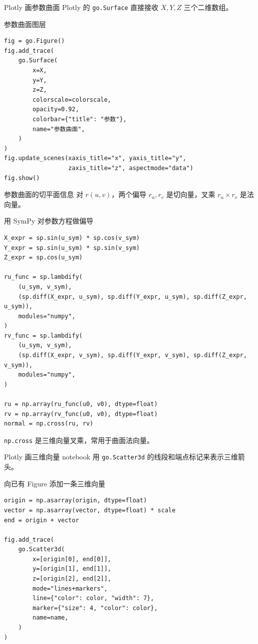 \documentclass[aspectratio=169,11pt]{ctexbeamer}
\begin{document}
\begin{frame}[fragile]{Plotly 画参数曲面}
  Plotly 的 \texttt{go.Surface} 直接接收 \(X,Y,Z\) 三个二维数组。

  \begin{block}{参数曲面图层}
\begin{Verbatim}[fontsize=\tiny]
fig = go.Figure()
fig.add_trace(
    go.Surface(
        x=X,
        y=Y,
        z=Z,
        colorscale=colorscale,
        opacity=0.92,
        colorbar={"title": "参数"},
        name="参数曲面",
    )
)
fig.update_scenes(xaxis_title="x", yaxis_title="y",
                  zaxis_title="z", aspectmode="data")
fig.show()
\end{Verbatim}
  \end{block}
\end{frame}

\begin{frame}[fragile]{参数曲面的切平面信息}
  对 \(r(u,v)\)，两个偏导 \(r_u,r_v\) 是切向量，叉乘 \(r_u\times r_v\) 是法向量。

  \begin{block}{用 SymPy 对参数方程做偏导}
\begin{Verbatim}[fontsize=\tiny]
X_expr = sp.sin(u_sym) * sp.cos(v_sym)
Y_expr = sp.sin(u_sym) * sp.sin(v_sym)
Z_expr = sp.cos(u_sym)

ru_func = sp.lambdify(
    (u_sym, v_sym),
    (sp.diff(X_expr, u_sym), sp.diff(Y_expr, u_sym), sp.diff(Z_expr, u_sym)),
    modules="numpy",
)
rv_func = sp.lambdify(
    (u_sym, v_sym),
    (sp.diff(X_expr, v_sym), sp.diff(Y_expr, v_sym), sp.diff(Z_expr, v_sym)),
    modules="numpy",
)

ru = np.array(ru_func(u0, v0), dtype=float)
rv = np.array(rv_func(u0, v0), dtype=float)
normal = np.cross(ru, rv)
\end{Verbatim}
  \end{block}

  \texttt{np.cross} 是三维向量叉乘，常用于曲面法向量。
\end{frame}

\begin{frame}[fragile]{Plotly 画三维向量}
  notebook 用 \texttt{go.Scatter3d} 的线段和端点标记来表示三维箭头。

  \begin{block}{向已有 Figure 添加一条三维向量}
\begin{Verbatim}[fontsize=\tiny]
origin = np.asarray(origin, dtype=float)
vector = np.asarray(vector, dtype=float) * scale
end = origin + vector

fig.add_trace(
    go.Scatter3d(
        x=[origin[0], end[0]],
        y=[origin[1], end[1]],
        z=[origin[2], end[2]],
        mode="lines+markers",
        line={"color": color, "width": 7},
        marker={"size": 4, "color": color},
        name=name,
    )
)
\end{Verbatim}
  \end{block}
\end{frame}
\end{document}
